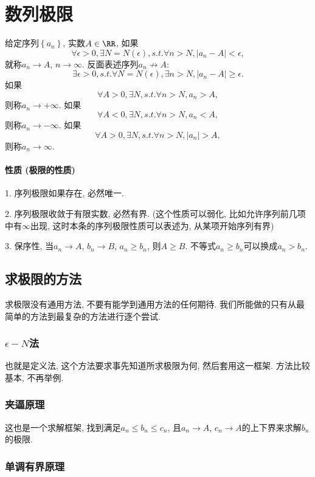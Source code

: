 \section{数列极限}
\bd{}{}
给定序列$\left\{ a_{n}\right\} $, 实数$A\in\RR$, 如果
$$
\forall\epsilon>0,\exists N=N(\epsilon),s.t.\forall n>N,\left|a_{n}-A\right|<\epsilon,
$$
就称$a_{n}\to A$, $n\to\infty$. 反面表述序列$a_{n}\not\to A$: 
$$
\exists\epsilon>0,s.t.\forall N=N(\epsilon),\exists n>N,\left|a_{n}-A\right|\ge\epsilon.
$$
如果
$$
\forall A>0,\exists N,s.t.\forall n>N,a_{n}>A,
$$
则称$a_{n}\to+\infty$. 如果
$$
\forall A<0,\exists N,s.t.\forall n>N,a_{n}<A,
$$
则称$a_{n}\to-\infty$. 如果
$$
\forall A>0,\exists N,s.t.\forall n>N,\left|a_{n}\right|>A,
$$
则称$a_{n}\to\infty$.
\ed
%

\paragraph{性质 (极限的性质)}

1. 序列极限如果存在, 必然唯一.

2. 序列极限收敛于有限实数, 必然有界. (这个性质可以弱化, 比如允许序列前几项中有$\infty$出现, 这时本条的序列极限性质可以表述为,
从某项开始序列有界)

3. 保序性, 当$a_{n}\to A$, $b_{n}\to B$, $a_{n}\ge b_{n}$, 则$A\ge B$.
不等式$a_{n}\ge b_{n}$可以换成$a_{n}>b_{n}$.

\subsection{求极限的方法}

求极限没有通用方法, 不要有能学到通用方法的任何期待. 我们所能做的只有从最简单的方法到最复杂的方法进行逐个尝试.

\subsubsection{$\epsilon-N$法}

也就是定义法, 这个方法要求事先知道所求极限为何, 然后套用这一框架. 方法比较基本, 不再举例.

\subsubsection{夹逼原理}

这也是一个求解框架, 找到满足$a_{n}\le b_{n}\le c_{n}$, 且$a_{n}\to A$, $c_{n}\to A$的上下界来求解$b_{n}$的极限.

\subsubsection{单调有界原理}

